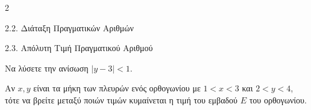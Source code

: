 \begin{ylh}{2}
    \item 2.2. Διάταξη Πραγματικών Αριθμών
    \item 2.3. Απόλυτη Τιμή Πραγματικού Αριθμού
\end{ylh}

\begin{alist}
\item Να λύσετε την ανίσωση $|y - 3| < 1$. 
\item Αν $x, y$ είναι τα μήκη των πλευρών ενός ορθογωνίου με $1 < x < 3$ και $2 < y < 4$, τότε να βρείτε μεταξύ ποιών τιμών κυμαίνεται η τιμή του εμβαδού $E$ του ορθογωνίου.
\end{alist}

